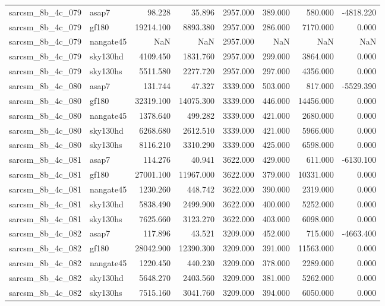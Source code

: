 \begin{tabular}{llrrrrrr}
sarcsm\_8b\_4c\_079 & asap7 & 98.228 & 35.896 & 2957.000 & 389.000 & 580.000 & -4818.220 \\
sarcsm\_8b\_4c\_079 & gf180 & 19214.100 & 8893.380 & 2957.000 & 286.000 & 7170.000 & 0.000 \\
sarcsm\_8b\_4c\_079 & nangate45 & NaN & NaN & 2957.000 & NaN & NaN & NaN \\
sarcsm\_8b\_4c\_079 & sky130hd & 4109.450 & 1831.760 & 2957.000 & 299.000 & 3864.000 & 0.000 \\
sarcsm\_8b\_4c\_079 & sky130hs & 5511.580 & 2277.720 & 2957.000 & 297.000 & 4356.000 & 0.000 \\
sarcsm\_8b\_4c\_080 & asap7 & 131.744 & 47.327 & 3339.000 & 503.000 & 817.000 & -5529.390 \\
sarcsm\_8b\_4c\_080 & gf180 & 32319.100 & 14075.300 & 3339.000 & 446.000 & 14456.000 & 0.000 \\
sarcsm\_8b\_4c\_080 & nangate45 & 1378.640 & 499.282 & 3339.000 & 421.000 & 2680.000 & 0.000 \\
sarcsm\_8b\_4c\_080 & sky130hd & 6268.680 & 2612.510 & 3339.000 & 421.000 & 5966.000 & 0.000 \\
sarcsm\_8b\_4c\_080 & sky130hs & 8116.210 & 3310.290 & 3339.000 & 425.000 & 6598.000 & 0.000 \\
sarcsm\_8b\_4c\_081 & asap7 & 114.276 & 40.941 & 3622.000 & 429.000 & 611.000 & -6130.100 \\
sarcsm\_8b\_4c\_081 & gf180 & 27001.100 & 11967.000 & 3622.000 & 379.000 & 10331.000 & 0.000 \\
sarcsm\_8b\_4c\_081 & nangate45 & 1230.260 & 448.742 & 3622.000 & 390.000 & 2319.000 & 0.000 \\
sarcsm\_8b\_4c\_081 & sky130hd & 5838.490 & 2499.900 & 3622.000 & 400.000 & 5252.000 & 0.000 \\
sarcsm\_8b\_4c\_081 & sky130hs & 7625.660 & 3123.270 & 3622.000 & 403.000 & 6098.000 & 0.000 \\
sarcsm\_8b\_4c\_082 & asap7 & 117.896 & 43.521 & 3209.000 & 452.000 & 715.000 & -4663.400 \\
sarcsm\_8b\_4c\_082 & gf180 & 28042.900 & 12390.300 & 3209.000 & 391.000 & 11563.000 & 0.000 \\
sarcsm\_8b\_4c\_082 & nangate45 & 1220.450 & 440.230 & 3209.000 & 378.000 & 2289.000 & 0.000 \\
sarcsm\_8b\_4c\_082 & sky130hd & 5648.270 & 2403.560 & 3209.000 & 381.000 & 5262.000 & 0.000 \\
sarcsm\_8b\_4c\_082 & sky130hs & 7515.160 & 3041.760 & 3209.000 & 394.000 & 6050.000 & 0.000 \\

\end{tabular}
